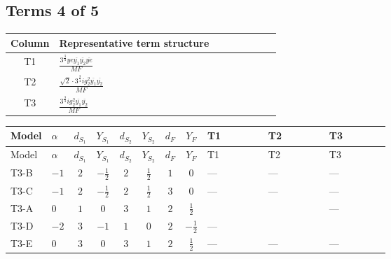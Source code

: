 \documentclass[8pt]{article}
\begin{document}
\begin{landscape}
\subsection*{Terms 4 of 5}
\begin{center}
\begin{tabular}{@{}c >{\raggedright\arraybackslash}p{0.82\linewidth}@{}}
\toprule
Column & Representative term structure \\
\midrule
T1 & \(\displaystyle \frac{3^{\frac{3}{4}} ye \overline{y_{1}} \overline{y_{2}} \overline{ye}}{MF}\) \\
\midrule
T2 & \(\displaystyle \frac{\sqrt{2} \cdot 3^{\frac{3}{4}} i g_{2}^{2} \overline{y_{1}} \overline{y_{2}}}{MF}\) \\
\midrule
T3 & \(\displaystyle \frac{3^{\frac{3}{4}} i g_{2}^{2} \overline{y_{1}} \overline{y_{2}}}{MF}\) \\
\midrule
\bottomrule
\end{tabular}
\end{center}
\smallskip
\tiny
\begin{longtable}{@{}llcccccc >{\raggedright\arraybackslash}p{0.21\linewidth} >{\raggedright\arraybackslash}p{0.21\linewidth} >{\raggedright\arraybackslash}p{0.21\linewidth}@{}}
\toprule
Model & $\alpha$ & $d_{S_1}$ & $Y_{S_1}$ & $d_{S_2}$ & $Y_{S_2}$ & $d_F$ & $Y_F$ & T1 & T2 & T3 \\
\midrule
\endfirsthead
\toprule
Model & $\alpha$ & $d_{S_1}$ & $Y_{S_1}$ & $d_{S_2}$ & $Y_{S_2}$ & $d_F$ & $Y_F$ & T1 & T2 & T3 \\
\midrule
\endhead
T3-B & $-1$ & $2$ & $-\frac{1}{2}$ & $2$ & $\frac{1}{2}$ & $1$ & $0$ & --- & --- & --- \\
\midrule
T3-C & $-1$ & $2$ & $-\frac{1}{2}$ & $2$ & $\frac{1}{2}$ & $3$ & $0$ & --- & --- & --- \\
\midrule
T3-A & $0$ & $1$ & $0$ & $3$ & $1$ & $2$ & $\frac{1}{2}$ & \scriptsize\adjustbox{max width=\linewidth}{$\begin{gathered} - \frac{3^{\frac{3}{4}} ye \overline{y_{1}} \overline{y_{2}} \overline{ye}}{12 MF}\end{gathered}$} & \scriptsize\adjustbox{max width=\linewidth}{$\begin{gathered} \frac{\sqrt{2} \cdot 3^{\frac{3}{4}} i g_{2}^{2} \overline{y_{1}} \overline{y_{2}}}{3 MF}\end{gathered}$} & --- \\
\midrule
T3-D & $-2$ & $3$ & $-1$ & $1$ & $0$ & $2$ & $-\frac{1}{2}$ & --- & \scriptsize\adjustbox{max width=\linewidth}{$\begin{gathered} - \frac{\sqrt{2} \cdot 3^{\frac{3}{4}} i g_{2}^{2} \overline{y_{1}} \overline{y_{2}}}{3 MF}\end{gathered}$} & \scriptsize\adjustbox{max width=\linewidth}{$\begin{gathered} - \frac{17 \cdot 3^{\frac{3}{4}} i g_{2}^{2} \overline{y_{1}} \overline{y_{2}}}{24 MF}\end{gathered}$} \\
\midrule
T3-E & $0$ & $3$ & $0$ & $3$ & $1$ & $2$ & $\frac{1}{2}$ & --- & --- & --- \\
\midrule
\bottomrule
\end{longtable}
\clearpage

\end{landscape}
\end{document}
